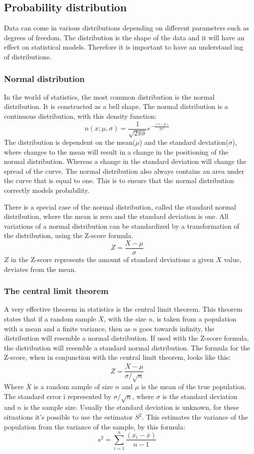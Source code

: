 \subsection{Probability distribution}
Data can come in various distributions depending on different parameters such
as degrees of freedom. The distribution is the shape of the data and it will have
an effect on statistical models. Therefore it is important to have an understanding of distributions.
\subsubsection{Normal distribution}
In the world of statistics, the most common distribution is the normal distribution. It is constructed as a bell shape. The normal distribution is a continuous distribution, with this density function:
$$n(x;\mu,\sigma) =\frac{1}{\sqrt{2\pi\sigma}}e^{-\frac{(x-\mu)}{2\sigma^2}}$$
The distribution is dependent on the mean($\mu$) and the standard deviation($\sigma$), where changes to the mean will result in a change in the positioning of the normal distribution. Whereas a change in the standard deviation will change the spread of the curve. The normal distribution also always contains an area under the curve that is equal to one. This is to ensure that the normal distribution correctly models probability.

There is a special case of the normal distribution, called the standard normal distribution, where the mean is zero and the standard deviation is one. All variations of a normal distribution can be standardized by a transformation of the distribution, using the Z-score formula.
\newline
$$Z=\frac{X-\mu}{\sigma}$$
\newline
$Z$ in the Z-score represents the amount of standard deviations a given $X$ value, deviates from the mean.

\subsubsection{The central limit theorem}
A very effective theorem in statistics is the central limit theorem. This theorem states that if a random sample $\overline{X}$, with the size $n$, is taken from a population with a mean and a finite variance, then as $n$ goes towards infinity, the distribution will resemble a normal distribution. If used with the Z-score formula, the distribution will resemble a standard normal distribution. The formula for the Z-score, when in conjunction with the central limit theorem, looks like this:
$$Z=\frac{\overline{X}-\mu}{\sigma/\sqrt{n}}$$
Where $\overline{X}$ is a random sample of size $n$ and $\mu$ is the mean of the true population. The standard error i represented by $\sigma/\sqrt{n}$, where $\sigma$ is the standard deviation and $n$ is the sample size.
Usually the standard deviation is unknown, for these situations it's possible to use the estimator $S^2$. This estimates the variance of the population from the variance of the sample, by this formula:
$$s^2=\sum_{i=1}^{n}\frac{(x_{i}-\overline{x})}{n-1}$$

